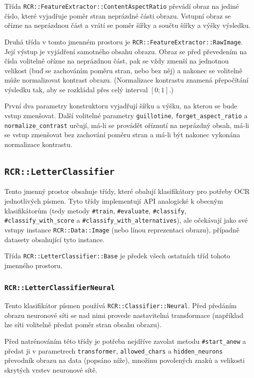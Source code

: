 \documentclass[a4paper]{article}
\begin{document}
Třída \texttt{RCR::FeatureExtractor::ContentAspectRatio} převádí obraz na jediné
číslo, které vyjadřuje poměr stran neprázdné části obrazu. Vstupní obraz se
ořízne na neprázdnou část a vrátí se poměr šířky a součtu šířky a výšky výsledku.

Druhá třída v tomto jmenném prostoru je \texttt{RCR::FeatureExtractor::RawImage}.
Její výstup je vyjádření samotného obsahu obrazu. Obraz se před převedením na
čísla volitelně ořízne na neprázdnou část, pak se vždy zmenší na jednotnou velikost
(buď se zachováním poměru stran, nebo bez něj) a nakonec se volitelně může
normalizovat kontrast obrazu. (Normalizace kontrastu znamená přepočítání
výsledku tak, aby se rozkládal přes celý interval $[0;1]$.)

První dva parametry konstruktoru vyjadřují šířku a výšku, na kterou se bude
vstup zmenšovat. Další volitelné parametry \texttt{guillotine},
\texttt{forget\_aspect\_ratio} a \texttt{normalize\_contrast} určují, má-li
se provádět oříznutí na neprázdný obsah, má-li se vstup zmenšovat bez zachování
poměru stran a má-li být nakonec vykonána normalizace kontrastu.

\subsection{\texttt{RCR::LetterClassifier}}
Tento jmenný prostor obsahuje třídy, které obalují klasifikátory pro potřeby
OCR jednotlivých písmen. Tyto třídy implementují API analogické k obecným
klasifikátorům (tedy metody \texttt{\#train}, \texttt{\#evaluate}, \texttt{\#classify},
\texttt{\#classify\_with\_score} a \texttt{\#classify\_with\_alternatives}),
ale očekávají jako své vstupy instance \texttt{RCR::Data::Image} (nebo línou
reprezentaci obrazu), případně datasety obsahující tyto instance.

Třída \texttt{RCR::LetterClassifier::Base} je předek všech ostatních tříd
tohoto jmenného prostoru.

\subsubsection{\texttt{RCR::LetterClassifierNeural}}
Tento klasifikátor písmen používá \texttt{RCR::Classifier::Neural}.
Před předáním obrazu neuronové síti se nad nimi provede nastavitelná
transformace (například lze síti volitelně předat poměr stran obsahu
obrazu).

Před natrénováním této třídy je potřeba nejdříve zavolat metodu
\texttt{\#start\_anew} a předat ji v parametrech \texttt{transformer},
\texttt{allowed\_chars} a \texttt{hidden\_neurons} převodník obrazu
na data (popsáno níže), množinu povolených znaků a velikosti skrytých
vrstev neuronové sítě.
\end{document}
